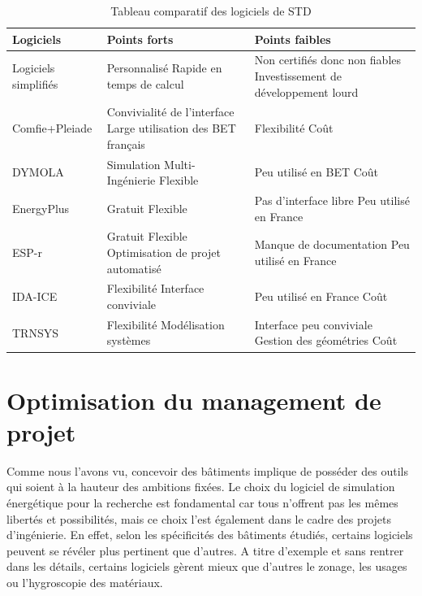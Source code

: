 \begin{table}[h]
\centering
\begin{tabular}{|p{3.5cm}||p{5.75cm}|p{5.75cm}|}
\hline Logiciels & Points forts & Points faibles \\
\hline
\hline Logiciels simplifiés & Personnalisé \newline Rapide en temps de calcul & Non certifiés donc non fiables \newline Investissement de développement lourd \\
\hline Comfie+Pleiade & Convivialité de l'interface \newline Large utilisation des BET français & Flexibilité \newline Coût \\
\hline DYMOLA & Simulation Multi-Ingénierie \newline Flexible & Peu utilisé en BET \newline Coût \\
\hline EnergyPlus & Gratuit \newline Flexible & Pas d'interface libre \newline Peu utilisé en France \\
\hline ESP-r & Gratuit \newline Flexible \newline Optimisation de projet automatisé & Manque de documentation \newline Peu utilisé en France \\
\hline IDA-ICE & Flexibilité \newline Interface conviviale & Peu utilisé en France \newline Coût \\
\hline TRNSYS & Flexibilité \newline Modélisation systèmes  & Interface peu conviviale \newline Gestion des géométries \newline Coût \\
\hline 
\end{tabular}
\caption{Tableau comparatif des logiciels de STD}
\label{Tab:Synthese_logiciels_STD}
\end{table}

\section{Optimisation du management de projet}

Comme nous l'avons vu, concevoir des bâtiments implique de posséder des outils qui soient à la hauteur des ambitions fixées. Le choix du logiciel de simulation énergétique pour la recherche est fondamental car tous n'offrent pas les mêmes libertés et possibilités, mais ce choix l'est également dans le cadre des projets d'ingénierie. En effet, selon les spécificités des bâtiments étudiés, certains logiciels peuvent se révéler plus pertinent que d'autres. A titre d'exemple et  sans rentrer dans les détails, certains logiciels gèrent mieux que d'autres le zonage, les usages ou l'hygroscopie des matériaux.

